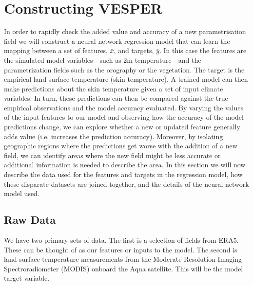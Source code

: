 \documentclass[twocolumn]{article}
\begin{document}
\section{Constructing VESPER}\label{sec:2}
In order to rapidly check the added value and accuracy of a new parametrisation field we will construct a neural network regression model that can learn the mapping between a set of features, $\bar{x}$, and targets, $\bar{y}$. In this case the features are the simulated model variables - such as 2m temperature - and the parametrization fields such as the orography or the vegetation. The target is the empirical land surface temperature (skin temperature). A trained model can then make predictions about the skin temperature given a set of input climate variables. In turn, these predictions can then be compared against the true empirical observations and the model accuracy evaluated. By varying the values of the input features to our model and observing how the accuracy of the model predictions change, we can explore whether a new or updated feature generally adds value (i.e. increases the prediction accuracy). Moreover, by isolating geographic regions where the predictions get worse with the addition of a new field, we can identify areas where the new field might be less accurate or additional information is needed to describe the area. In this section we will now describe the data used for the features and targets in the regression model, how these disparate datasets are joined together, and the details of the neural network model used.


\subsection{Raw Data}
We have two primary sets of data. The first is a selection of fields from ERA5\cite{Hersbach}. These can be thought of as our features or inputs to the model. The second is land surface temperature measurements from the Moderate Resolution Imaging Spectroradiometer (MODIS) \cite{MODIS} onboard the Aqua satellite.  This will be the model target variable. 
\end{document}
